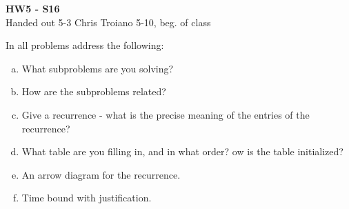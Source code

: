 \documentclass[11pt]{article}
\begin{document}
\begin{center}
{\bf\large HW5 - S16}\\
Handed out 5-3 \hfill Chris Troiano \hfill 5-10, beg.
of class \\
\end{center}


In all problems address the following:
\begin{enumerate}[(a)]
\item What subproblems are you solving?
\item How are the subproblems related?
\item Give a recurrence - what is the precise meaning of the entries
  of the recurrence?
\item What table are you filling in, and in what order?
ow is the table initialized?
\item An arrow diagram for the recurrence.
\item Time bound with justification.
\end{enumerate}
\end{document}
